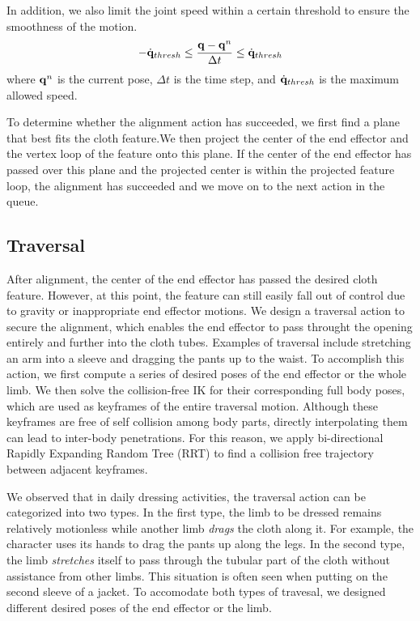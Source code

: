 In addition, we also limit the joint speed within a certain threshold to ensure the smoothness of the motion.
\begin{displaymath}
-\dot{\mathbf{q}}_{thresh} \leq \frac{\mathbf{q} - \mathbf{q}^n}{\Delta t} \leq \dot{\mathbf{q}}_{thresh}
\end{displaymath}
where $\mathbf{q}^n$ is the current pose, $\Delta t$ is the time step, and $\dot{\mathbf{q}}_{thresh}$ is the maximum allowed speed.

To determine whether the alignment action has succeeded, we first find a plane that best fits the cloth feature.We then project the center of the end effector and the vertex loop of the feature onto this plane. If the center of the end effector has passed over this plane and the projected center is within the projected feature loop, the alignment has succeeded and we move on to the next action in the queue.

\subsection{Traversal}
After alignment, the center of the end effector has passed the desired cloth feature. However, at this point, the feature can still easily fall out of control due to gravity or inappropriate end effector motions. We design a traversal action to secure the alignment, which enables the end effector to pass throught the opening entirely and further into the cloth tubes. Examples of traversal include stretching an arm into a sleeve and dragging the pants up to the waist. To accomplish this action, we first compute a series of desired poses of the end effector or the whole limb. We then solve the collision-free IK for their corresponding full body poses, which are used as keyframes of the entire traversal motion. Although these keyframes are free of self collision among body parts, directly interpolating them can lead to inter-body penetrations. For this reason, we apply bi-directional Rapidly Expanding Random Tree (RRT) \cite{} to find a collision free trajectory between adjacent keyframes.

We observed that in daily dressing activities, the traversal action can be categorized into two types. In the first type, the limb to be dressed remains relatively motionless while another limb \emph{drags} the cloth along it. For example, the character uses its hands to drag the pants up along the legs. In the second type, the limb \emph{stretches} itself to pass through the tubular part of the cloth without assistance from other limbs. This situation is often seen when putting on the second sleeve of a jacket. To accomodate both types of travesal, we designed different desired poses of the end effector or the limb.

